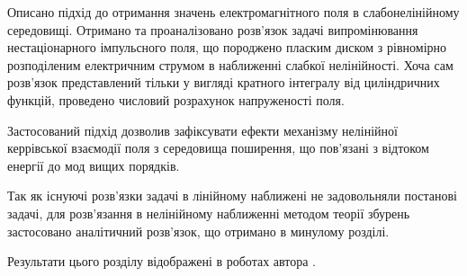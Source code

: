 Описано підхід до отримання значень електромагнітного поля в слабонелінійному 
середовищі. Отримано та проаналізовано розв’язок задачі випромінювання 
нестаціонарного імпульсного поля, що породжено пласким диском з рівномірно 
розподіленим електричним струмом в наближенні слабкої нелінійності. Хоча сам 
розв’язок представлений тільки у вигляді кратного інтегралу від циліндричних 
функцій, проведено числовий розрахунок напруженості поля.

Застосований підхід дозволив зафіксувати ефекти механізму нелінійної керрівської 
взаємодії поля з середовища поширення, що пов'язані з відтоком енергії до 
мод вищих порядків.

Так як існуючі розв’язки задачі в лінійному наближені не задовольняли постанові 
задачі, для розв'язання в нелінійному наближенні методом теорії збурень
застосовано аналітичний розв'язок, що отримано в минулому розділі.


Результати цього розділу відображені в роботах автора 
\cite{my:Vesnik2015, my:Vesnik2017, my:Vesnik2017-2, my:MMET2014,
my:UWBUSIS2014, my:ICATT2015, my:UWBUSIS2016, my:KPI2016, my:DIPED2019}.

